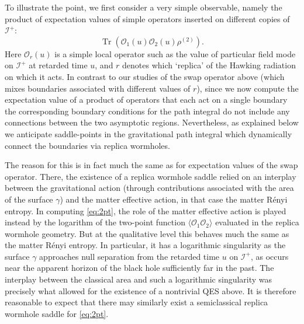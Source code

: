 \documentclass[letterpaper,12pt]{article}
\DeclareMathOperator{\Tr}{Tr}
\newcommand*{\scri}{\mathscr{I}} %
\begin{document}
To illustrate the point, we first consider a very simple observable, namely the product of expectation values of simple operators inserted on different copies of $\scri^+$:
\begin{equation}\label{eq:2pt}
	\Tr(\mathcal{O}_1(u)\mathcal{O}_2(u) \rho^{(2)} ).
\end{equation}
Here $\mathcal{O}_r(u)$ is a simple local operator such as the value of particular field mode on $\scri^+$ at retarded time $u$, and $r$ denotes which `replica' of the Hawking radiation on which it acts. In contrast to our studies of the swap operator above (which mixes boundaries associated with different values of $r$), since we now compute the expectation value of a product of operators that each act on a single boundary the corresponding boundary conditions for the path integral do not include any connections between the two asymptotic regions. Nevertheless, as explained below we anticipate saddle-points in the gravitational path integral which dynamically connect the boundaries via replica wormholes.

The reason for this is in fact much the same as for expectation values of the swap operator. There, the existence of a replica wormhole saddle relied on an interplay between the gravitational action (through contributions associated with the area of the surface $\gamma$) and the matter effective action, in that case the matter R\'enyi entropy. In computing \eqref{eq:2pt}, the role of the matter effective action is played instead by the logarithm of the two-point function $\langle\mathcal{O}_1\mathcal{O}_2\rangle$ evaluated in the replica wormhole geometry. But at the qualitative level this behaves  much the same as the matter R\'enyi entropy. In particular, it has a logarithmic singularity as the surface $\gamma$ approaches null separation from the retarded time $u$ on $\scri^+$, as occurs near the apparent horizon of the black hole sufficiently far in the past. The interplay between the classical area and such a logarithmic singularity was precisely what allowed for the existence of a nontrivial QES above. It is therefore reasonable to expect that there may similarly exist a semiclassical replica wormhole saddle for \eqref{eq:2pt}.
\end{document}
